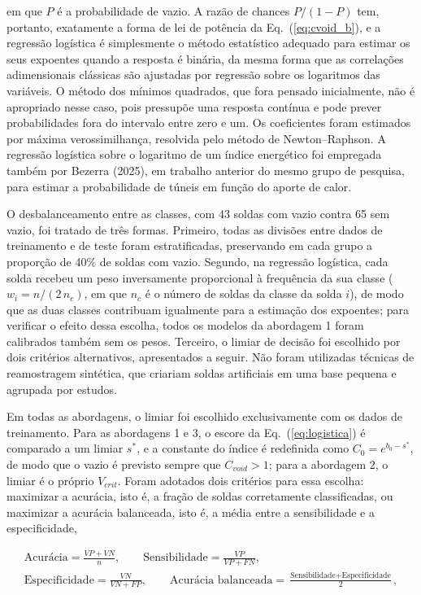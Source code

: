 \documentclass[12pt,openany]{report}
\begin{document}
\noindent em que $P$ é a probabilidade de vazio. A razão de chances $P/(1-P)$ tem, portanto, exatamente a forma de lei de potência da Eq.~(\ref{eq:cvoid_b}), e a regressão logística é simplesmente o método estatístico adequado para estimar os seus expoentes quando a resposta é binária, da mesma forma que as correlações adimensionais clássicas são ajustadas por regressão sobre os logaritmos das variáveis. O método dos mínimos quadrados, que fora pensado inicialmente, não é apropriado nesse caso, pois pressupõe uma resposta contínua e pode prever probabilidades fora do intervalo entre zero e um. Os coeficientes foram estimados por máxima verossimilhança, resolvida pelo método de Newton--Raphson. A regressão logística sobre o logaritmo de um índice energético foi empregada também por Bezerra (2025), em trabalho anterior do mesmo grupo de pesquisa, para estimar a probabilidade de túneis em função do aporte de calor.

O desbalanceamento entre as classes, com 43 soldas com vazio contra 65 sem vazio, foi tratado de três formas. Primeiro, todas as divisões entre dados de treinamento e de teste foram estratificadas, preservando em cada grupo a proporção de 40\% de soldas com vazio. Segundo, na regressão logística, cada solda recebeu um peso inversamente proporcional à frequência da sua classe ($w_i = n/(2\,n_{c})$, em que $n_{c}$ é o número de soldas da classe da solda $i$), de modo que as duas classes contribuam igualmente para a estimação dos expoentes; para verificar o efeito dessa escolha, todos os modelos da abordagem 1 foram calibrados também sem os pesos. Terceiro, o limiar de decisão foi escolhido por dois critérios alternativos, apresentados a seguir. Não foram utilizadas técnicas de reamostragem sintética, que criariam soldas artificiais em uma base pequena e agrupada por estudos.

Em todas as abordagens, o limiar foi escolhido exclusivamente com os dados de treinamento. Para as abordagens 1 e 3, o escore da Eq.~(\ref{eq:logistica}) é comparado a um limiar $s^{*}$, e a constante do índice é redefinida como $C_0 = e^{b_0 - s^{*}}$, de modo que o vazio é previsto sempre que $C_{void} > 1$; para a abordagem 2, o limiar é o próprio $V_{crit}$. Foram adotados dois critérios para essa escolha: maximizar a acurácia, isto é, a fração de soldas corretamente classificadas, ou maximizar a acurácia balanceada, isto é, a média entre a sensibilidade e a especificidade,

\begin{equation}
\begin{gathered}
\text{Acurácia} = \frac{VP + VN}{n}, \qquad \text{Sensibilidade} = \frac{VP}{VP + FN}, \\[4pt]
\text{Especificidade} = \frac{VN}{VN + FP}, \qquad \text{Acurácia balanceada} = \frac{\text{Sensibilidade} + \text{Especificidade}}{2},
\end{gathered}
\label{eq:metricas}
\end{equation}
\end{document}
